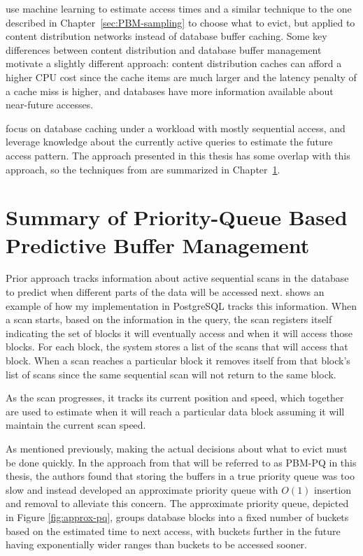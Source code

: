 \citet{relaxedBelady} use machine learning to estimate access times and a similar technique to the one described in Chapter~\ref{sec:PBM-sampling} to choose what to evict, but applied to content distribution networks instead of database buffer caching. Some key differences between content distribution and database buffer management motivate a slightly different approach: content distribution caches can afford a higher CPU cost since the cache items are much larger and the latency penalty of a cache miss is higher, and databases have more information available about near-future accesses.

\citet{pbm} focus on database caching under a workload with mostly sequential access, and leverage knowledge about the currently active queries to estimate the future access pattern. The approach presented in this thesis has some overlap with this approach, so the techniques from \cite{pbm} are summarized in Chapter~\ref{sec:pbm-pq_summary}.

\section{Summary of Priority-Queue Based Predictive Buffer Management}
\label{sec:pbm-pq_summary}

Prior approach \cite{pbm} tracks information about active sequential scans in the database to predict when different parts of the data will be accessed next.  shows an example of how my implementation in PostgreSQL tracks this information. When a scan starts, based on the information in the query, the scan registers itself indicating the set of blocks it will eventually access and when it will access those blocks. For each block, the system stores a list of the scans that will access that block. When a scan reaches a particular block it removes itself from that block's list of scans since the same sequential scan will not return to the same block.

As the scan progresses, it tracks its current position and speed, which together are used to estimate when it will reach a particular data block assuming it will maintain the current scan speed.

As mentioned previously, making the actual decisions about what to evict must be done quickly. In the approach from \cite{pbm} that will be referred to as PBM-PQ in this thesis, the authors found that storing the buffers in a true priority queue was too slow and instead developed an approximate priority queue with $O(1)$ insertion and removal to alleviate this concern. The approximate priority queue, depicted in Figure \ref{fig:approx-pq}, groups database blocks into a fixed number of buckets based on the estimated time to next access, with buckets further in the future having exponentially wider ranges than buckets to be accessed sooner.

